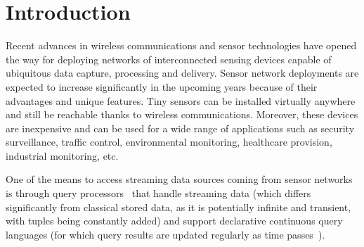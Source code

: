 \section{Introduction}
\label{intro}

Recent advances in wireless communications and sensor technologies have opened the way for deploying networks of
interconnected sensing devices capable of ubiquitous data capture, processing and delivery. Sensor network deployments
are expected to increase significantly in the upcoming years because of their advantages and unique features. Tiny
sensors can be installed virtually anywhere and still be reachable thanks to wireless communications. Moreover, these
devices are inexpensive and can be used for a wide range of applications such as security surveillance, traffic
control, environmental monitoring, healthcare provision, industrial monitoring, etc.\

One of the means to access streaming data sources coming from sensor networks is through query
processors~\cite{Madden_05,Arasu_06a,Galpin_09} that handle streaming data (which differs significantly from classical
stored data, as it is potentially infinite and transient, with tuples being constantly added) and support declarative
continuous query languages (for which query results are updated regularly as time passes~\cite{Terry_92}).


